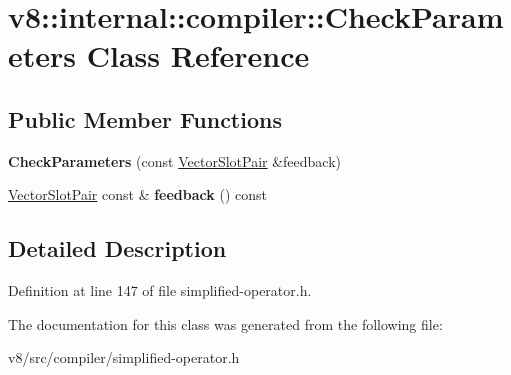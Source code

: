 \hypertarget{classv8_1_1internal_1_1compiler_1_1CheckParameters}{}\section{v8\+:\+:internal\+:\+:compiler\+:\+:Check\+Parameters Class Reference}
\label{classv8_1_1internal_1_1compiler_1_1CheckParameters}
\subsection*{Public Member Functions}
\begin{DoxyCompactItemize}
\item 
\mbox{\label{classv8_1_1internal_1_1compiler_1_1CheckParameters_a8b2a287e01e354a3da16b9550b140cc4}} 
{\bfseries Check\+Parameters} (const \mbox{\hyperlink{classv8_1_1internal_1_1VectorSlotPair}{Vector\+Slot\+Pair}} \&feedback)
\item 
\mbox{\label{classv8_1_1internal_1_1compiler_1_1CheckParameters_a1b8514c8f2830e1c195013c6e9795e81}} 
\mbox{\hyperlink{classv8_1_1internal_1_1VectorSlotPair}{Vector\+Slot\+Pair}} const  \& {\bfseries feedback} () const
\end{DoxyCompactItemize}


\subsection{Detailed Description}


Definition at line 147 of file simplified-\/operator.\+h.



The documentation for this class was generated from the following file\+:\begin{DoxyCompactItemize}
\item 
v8/src/compiler/simplified-\/operator.\+h\end{DoxyCompactItemize}
